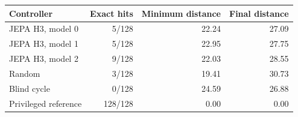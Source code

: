 \begin{tabular}{lrrr}
\toprule
\rowcolor{Navy!8}
Controller & Exact hits & Minimum distance & Final distance \\
\midrule
JEPA H3, model 0 & 5/128 & 22.24 & 27.09 \\
JEPA H3, model 1 & 5/128 & 22.95 & 27.75 \\
JEPA H3, model 2 & 9/128 & 22.03 & 28.55 \\
\midrule
Random & 3/128 & 19.41 & 30.73 \\
Blind cycle & 0/128 & 24.59 & 26.88 \\
Privileged reference & 128/128 & 0.00 & 0.00 \\
\bottomrule
\end{tabular}
